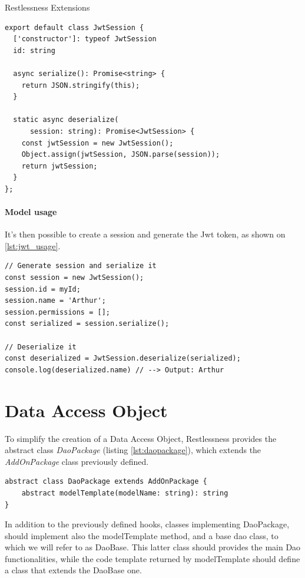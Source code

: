 \begin{chapter}{Restlessness Extensions}
    \bigskip
    \begin{lstlisting}[caption=A JwtSession class created by the auth-jwt package, label={lst:new_model_auth}]
export default class JwtSession {
  ['constructor']: typeof JwtSession
  id: string

  async serialize(): Promise<string> {
    return JSON.stringify(this);
  }

  static async deserialize(
      session: string): Promise<JwtSession> {
    const jwtSession = new JwtSession();
    Object.assign(jwtSession, JSON.parse(session));
    return jwtSession;
  }
};
    \end{lstlisting}

    \paragraph{Model usage}
    It's then possible to create a session and generate the Jwt token, as shown
    on \ref{lst:jwt_usage}.

    \bigskip
    \begin{lstlisting}[caption=User model usage, label={lst:jwt_usage}]
// Generate session and serialize it
const session = new JwtSession();
session.id = myId;
session.name = 'Arthur';
session.permissions = [];
const serialized = session.serialize();

// Deserialize it
const deserialized = JwtSession.deserialize(serialized);
console.log(deserialized.name) // --> Output: Arthur
    \end{lstlisting}

    \section{Data Access Object}
    \label{sec:data_access_object}

    To simplify the creation of a Data Access Object, Restlessness provides the
    abstract class \textit{DaoPackage} (listing \ref{lst:daopackage}), which extends
    the \textit{AddOnPackage} class previously defined.

    \bigskip
    \begin{lstlisting}[caption=DaoPackage class definition, label={lst:daopackage}]
abstract class DaoPackage extends AddOnPackage {
    abstract modelTemplate(modelName: string): string
}
    \end{lstlisting}

    In addition to the previously defined hooks, classes implementing DaoPackage,
    should implement also the modelTemplate method, and a base dao class, to which
    we will refer to as DaoBase. This latter class should provides the main Dao
    functionalities, while the code template returned by modelTemplate should define
    a class that extends the DaoBase one.


\end{chapter}
